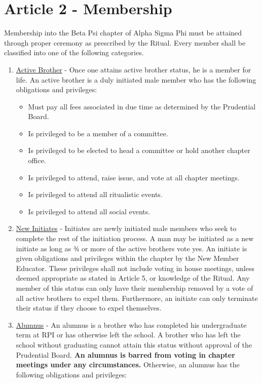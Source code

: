 \documentclass{article}
\begin{document}
\section*{Article 2 - Membership}
\hspace*{1cm}Membership into the Beta Psi chapter of Alpha Sigma Phi must be attained through proper ceremony as prescribed by the Ritual. Every member shall be classified into one of the following categories.
\begin{enumerate}
    \item  \underline{Active Brother} - Once one attains active brother status, he is a member for life. An active  brother is a duly initiated male member who has the following obligations and privileges:
    \begin{itemize}
        \item Must pay all fees associated in due time as determined by the Prudential Board.
        \item Is privileged to be a member of a committee.
        \item Is privileged to be elected to head a committee or hold another chapter office. 
        \item Is privileged to attend, raise issue, and vote at all chapter meetings.
        \item Is privileged to attend all ritualistic events.
        \item Is privileged to attend all social events.
    \end{itemize}
    \item  \underline{New Initiates} - Initiates are newly initiated male members who seek to complete the rest of the initiation process. A man may be initiated as a new initiate as long as ¾ or more of the active brothers vote yes. An initiate is given obligations and privileges within the chapter by the New Member Educator. These privileges shall not include voting in house meetings, unless deemed appropriate as stated in Article 5, or knowledge of the Ritual. Any member of this status can only have their membership removed by a vote of all active brothers to expel them. Furthermore, an initiate can only terminate their status if they choose to expel themselves.
    \item \underline{Alumnus} - An alumnus is a brother who has completed his undergraduate term at RPI or has otherwise left the school. A brother who has left the school without graduating cannot attain this status without approval of the Prudential Board. \textbf{An alumnus is barred from voting in chapter meetings under any circumstances.} Otherwise, an alumnus has the following obligations and privileges:

\end{enumerate}
\end{document}
